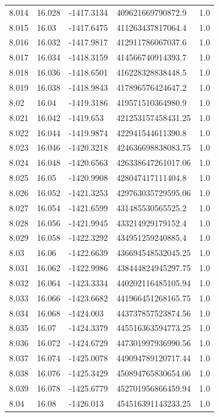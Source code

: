 \begin{tabular}{lllll}
8.014 & 16.028 & -1417.3134 & 409621669790872.9 & 1.0 \\
8.015 & 16.03 & -1417.6475 & 411263437817064.4 & 1.0 \\
8.016 & 16.032 & -1417.9817 & 412911786067037.6 & 1.0 \\
8.017 & 16.034 & -1418.3159 & 414566740914393.7 & 1.0 \\
8.018 & 16.036 & -1418.6501 & 416228328838448.5 & 1.0 \\
8.019 & 16.038 & -1418.9843 & 417896576424647.2 & 1.0 \\
8.02 & 16.04 & -1419.3186 & 419571510364980.9 & 1.0 \\
8.021 & 16.042 & -1419.653 & 421253157458431.25 & 1.0 \\
8.022 & 16.044 & -1419.9874 & 422941544611390.8 & 1.0 \\
8.023 & 16.046 & -1420.3218 & 424636698838083.75 & 1.0 \\
8.024 & 16.048 & -1420.6563 & 426338647261017.06 & 1.0 \\
8.025 & 16.05 & -1420.9908 & 428047417111404.8 & 1.0 \\
8.026 & 16.052 & -1421.3253 & 429763035729595.06 & 1.0 \\
8.027 & 16.054 & -1421.6599 & 431485530565525.2 & 1.0 \\
8.028 & 16.056 & -1421.9945 & 433214929179152.4 & 1.0 \\
8.029 & 16.058 & -1422.3292 & 434951259240885.4 & 1.0 \\
8.03 & 16.06 & -1422.6639 & 436694548532045.25 & 1.0 \\
8.031 & 16.062 & -1422.9986 & 438444824945297.75 & 1.0 \\
8.032 & 16.064 & -1423.3334 & 440202116485105.94 & 1.0 \\
8.033 & 16.066 & -1423.6682 & 441966451268165.75 & 1.0 \\
8.034 & 16.068 & -1424.003 & 443737857523874.56 & 1.0 \\
8.035 & 16.07 & -1424.3379 & 445516363594773.25 & 1.0 \\
8.036 & 16.072 & -1424.6729 & 447301997936990.56 & 1.0 \\
8.037 & 16.074 & -1425.0078 & 449094789120717.44 & 1.0 \\
8.038 & 16.076 & -1425.3429 & 450894765830654.06 & 1.0 \\
8.039 & 16.078 & -1425.6779 & 452701956866459.94 & 1.0 \\
8.04 & 16.08 & -1426.013 & 454516391143233.25 & 1.0 \\

\end{tabular}
